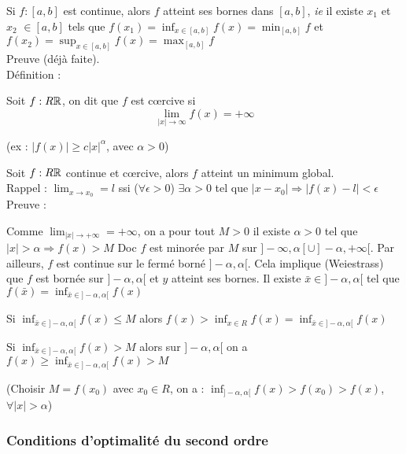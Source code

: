 		Si $f : [a, b]$ est continue, alors $f$ atteint ses bornes dans $[a, b]$, \textit{ie} il existe $x_1$ et $x_2$ $ \in [a, b]$ tels que $\displaystyle f(x_1) = \inf_{x \in [a, b]} f(x) = \min_{[a, b]} f$ et $\displaystyle f(x_2) = \sup_{x \in [a, b]} f(x) = \max_{[a, b]} f$ \\
		
		Preuve (déjà faite).\\
		
		Définition :
		
		Soit $f : R \mathbb{R}$, on dit que $f$ est c\oe rcive si \[ \lim_{|x| \rightarrow \infty} f(x) = + \infty \]
		
		(ex : $|f(x)| \geq c|x|^\alpha$, avec $\alpha > 0$)
		
		Soit $f : R \mathbb{R}$ continue et c\oe rcive, alors $f$ atteint un minimum global.\\
		
		Rappel : $\displaystyle \lim_{x \rightarrow x_0} = l$ ssi ($\forall \epsilon >0$) $\exists \alpha >0$ tel que $|x-x_0| \Rightarrow |f(x) - l| < \epsilon$\\
		
		Preuve :
		
		Comme $\displaystyle \lim_{|x| \rightarrow + \infty} = +\infty$, on a pour tout $M>0$ il existe $\alpha >0$ tel que $|x|>\alpha \Rightarrow f(x)>M$
		Doc $f$ est minorée par $M$ sur $]-\infty, \alpha[ \cup ]-\alpha, +\infty[$. Par ailleurs, $f$ est continue sur le fermé borné $]-\alpha, \alpha[$.
		Cela implique (Weiestrass) que $f$ est bornée sur $]-\alpha, \alpha[$ et $y$ atteint ses bornes.
		Il existe $ \bar{x} \in ]-\alpha, \alpha[$ tel que $\displaystyle f(\bar{x}) = \inf_{\bar{x} \in ]-\alpha, \alpha[} f(x)$
		
		Si $\displaystyle \inf_{\bar{x} \in ]-\alpha, \alpha[} f(x) \leq M$ alors $\displaystyle f(x) > \inf_{x \in R} f(x) = \inf_{\bar{x} \in ]-\alpha, \alpha[} f(x)$
		
		Si $\displaystyle \inf_{\bar{x} \in ]-\alpha, \alpha[} f(x) > M$ alors sur $]-\alpha, \alpha[$ on a $\displaystyle f(x) \geq \inf_{\bar{x} \in ]-\alpha, \alpha[} f(x) > M$
		
		(Choisir $M = f(x_0)$ avec $x_0 \in R$, on a : $\inf_{]-\alpha, \alpha[} f(x) > f(x_0) > f(x)$, $\forall |x| > \alpha$)
		
		\subsubsection{Conditions d'optimalité du second ordre}
		
